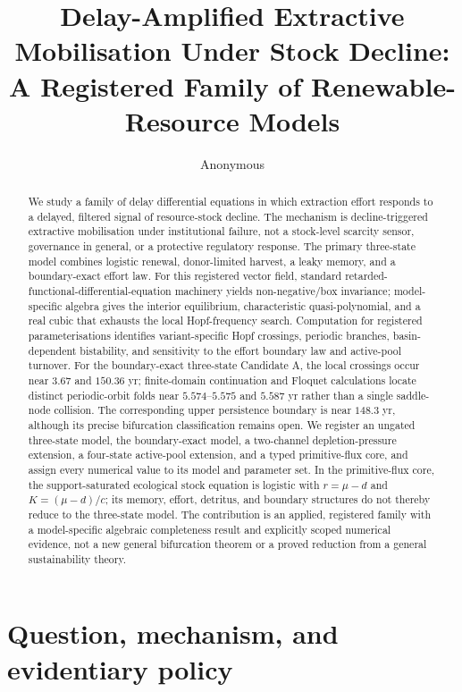 \documentclass[11pt]{article}
\title{Delay-Amplified Extractive Mobilisation Under Stock Decline:\\
A Registered Family of Renewable-Resource Models}
\author{Anonymous}
\date{}
\begin{document}
\maketitle

\begin{abstract}
We study a family of delay differential equations in which extraction effort responds to a delayed, filtered signal of resource-stock decline. The mechanism is decline-triggered extractive mobilisation under institutional failure, not a stock-level scarcity sensor, governance in general, or a protective regulatory response. The primary three-state model combines logistic renewal, donor-limited harvest, a leaky memory, and a boundary-exact effort law. For this registered vector field, standard retarded-functional-differential-equation machinery yields non-negative/box invariance; model-specific algebra gives the interior equilibrium, characteristic quasi-polynomial, and a real cubic that exhausts the local Hopf-frequency search. Computation for registered parameterisations identifies variant-specific Hopf crossings, periodic branches, basin-dependent bistability, and sensitivity to the effort boundary law and active-pool turnover. For the boundary-exact three-state Candidate A, the local crossings occur near $3.67$ and $150.36$ yr; finite-domain continuation and Floquet calculations locate distinct periodic-orbit folds near $5.574$--$5.575$ and $5.587$ yr rather than a single saddle-node collision. The corresponding upper persistence boundary is near $148.3$ yr, although its precise bifurcation classification remains open. We register an ungated three-state model, the boundary-exact model, a two-channel depletion-pressure extension, a four-state active-pool extension, and a typed primitive-flux core, and assign every numerical value to its model and parameter set. In the primitive-flux core, the support-saturated ecological stock equation is logistic with $r=\mu-d$ and $K=(\mu-d)/c$; its memory, effort, detritus, and boundary structures do not thereby reduce to the three-state model. The contribution is an applied, registered family with a model-specific algebraic completeness result and explicitly scoped numerical evidence, not a new general bifurcation theorem or a proved reduction from a general sustainability theory.
\end{abstract}

\section{Question, mechanism, and evidentiary policy}
\end{document}
